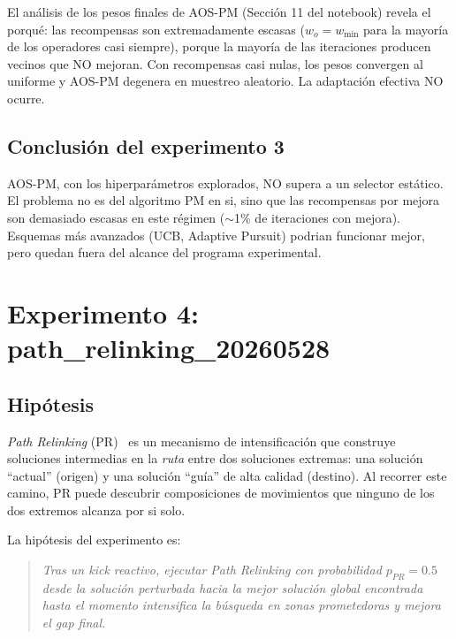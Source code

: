 El análisis de los pesos finales de AOS-PM (Sección 11 del notebook)
revela el porqué: las recompensas son extremadamente escasas
($w_o = w_{\min}$ para la mayoría de los operadores casi siempre),
porque la mayoría de las iteraciones producen vecinos que NO mejoran.
Con recompensas casi nulas, los pesos convergen al uniforme y AOS-PM
degenera en muestreo aleatorio. La adaptación efectiva NO ocurre.

\subsection{Conclusión del experimento 3}

AOS-PM, con los hiperparámetros explorados, NO supera a un selector
estático. El problema no es del algoritmo PM en si, sino que las
recompensas por mejora son demasiado escasas en este régimen ($\sim$1\%
de iteraciones con mejora). Esquemas más avanzados (UCB, Adaptive
Pursuit) podrian funcionar mejor, pero quedan fuera del alcance del
programa experimental.

\section{Experimento 4: path\_relinking\_20260528}
\label{sec:exp-pr}

\subsection{Hipótesis}

\emph{Path Relinking} (PR)~\cite{glover2000} es un mecanismo de intensificación que
construye soluciones intermedias en la \emph{ruta} entre dos
soluciones extremas: una solución ``actual'' (origen) y una solución
``guía'' de alta calidad (destino). Al recorrer este camino, PR puede
descubrir composiciones de movimientos que ninguno de los dos extremos
alcanza por si solo.

La hipótesis del experimento es:

\begin{quote}
\textit{Tras un kick reactivo, ejecutar Path Relinking con probabilidad
$p_{PR} = 0.5$ desde la solución perturbada hacia la mejor solución
global encontrada hasta el momento intensifica la búsqueda en zonas
prometedoras y mejora el gap final.}
\end{quote}

